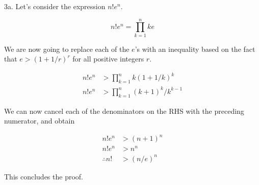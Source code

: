 \documentclass{article}
\begin{document}
3a. Let's consider the expression $n!e^n$.

\[ n!e^n = \prod_{k=1}^n ke \]

We are now going to replace each of the $e$'s with an inequality based on the fact that $e > (1 + 1 / r)^r$ for all positive integers $r$.

\begin{align*}
    n!e^n &> \prod_{k=1}^n k(1 + 1 /k)^k \\
    n!e^n &> \prod_{k=1}^n (k + 1)^k / k^{k - 1}
\end{align*}

We can now cancel each of the denominators on the RHS with the preceding numerator, and obtain

\begin{align*}
    n!e^n &> (n + 1)^n \\
    n!e^n &> n^n \\
    \therefore n! &> (n / e)^n
\end{align*}

This concludes the proof.
\end{document}

